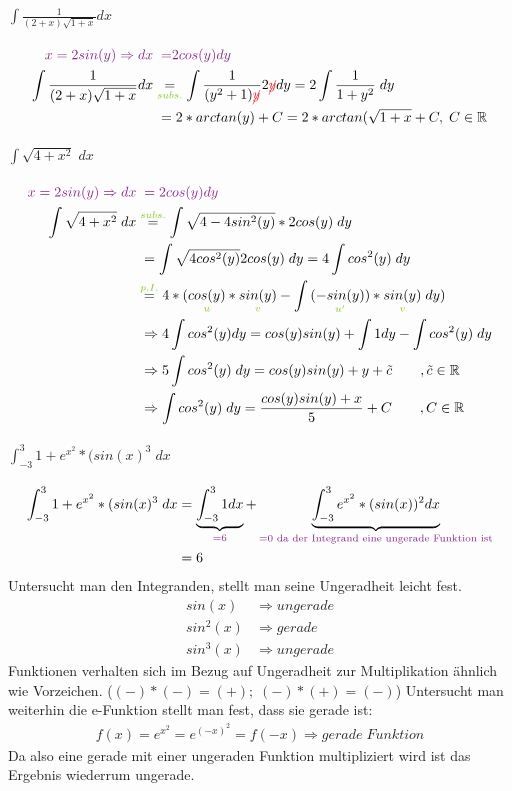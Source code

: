 \documentclass[12pt,a4paper]{article}%
\numberwithin{equation}{section}
\newcommand{\R}{\mathbb{R}} %
\newcommand{\subsubsubsection}{\paragraph}
\def\colBord#1{\begingroup\color{Fuchsia}{#1}\endgroup}
\def\colRed#1{\begingroup\color{Red}{#1}\endgroup}
\def\colGreen#1{\begingroup\color{LimeGreen}{#1}\endgroup}
\def\usGreen#1#2{\underset{\colGreen{#1}}{#2}}
\numberwithin{equation}{subsection}
\begin{document}
		\subsubsubsection{$\int \frac{1}{(2+x) \sqrt{1+x}}dx$}
		\begin{align}
			\colBord{x = 2sin(y) \Rightarrow dx} &\;\;\colBord{=} \colBord{2cos(y) dy} \nonumber\\
			\int \frac{1}{(2+x) \sqrt{1+x}}dx &\usGreen{subs.}{=} 
			\int \frac{1}{(y^2 + 1) \colRed{\cancel{y}}} 2\colRed{\cancel{y}} dy 
			= 2\int \frac{1}{1+y^2}\;dy \nonumber\\
			&\;= 2*arctan(y) + C = 2* arctan(\sqrt{1+x} + C ,\;C\in\R
		\end{align}
		
		\subsubsubsection{$\int \sqrt{4+x^2} \; dx$}
		\begin{align}
			\colBord{x = 2 sin(y) \Rightarrow dx} &\;\;\colBord{=} \colBord{\;2cos(y)dy} \nonumber\\
			\int \sqrt{4+x^2} \; dx &\overset{\colGreen{subs.}}{=}
			\int \sqrt{4-4sin^2(y)} * 2cos(y) \; dy \nonumber\\
			&\;= \int \sqrt{4cos^2(y)} 2cos(y) \; dy = 4\int cos^2(y) \; dy \nonumber\\
			&\overset{\colGreen{p.I.}}{=} 4*(\usGreen{u}{cos(y)} * \usGreen{v}{sin(y)} - \int \usGreen{u'}{(-sin(y))}*\usGreen{v}{sin(y)}\;dy) \nonumber\\
			&\;\Rightarrow 4\int cos^2(y) dy = cos(y)sin(y) + \int 1dy - \int cos^2(y)\; dy \nonumber\\
			&\;\Rightarrow 5\int cos^2(y)\;dy = cos(y)sin(y) + y + \tilde{c} \qquad ,\tilde{c}\in\R\nonumber\\
			&\;\Rightarrow \int cos^2(y)\;dy = \frac{cos(y)sin(y)+x}{5}+C \qquad, C\in\R
		\end{align}
		
		\subsubsubsection{$\int_{-3}^3 1+e^{x^2} *(sin(x)^3\;dx$}
		\begin{align}
			\int_{-3}^3 1+e^{x^2} *(sin(x)^3\;dx &= \underbrace{\int_{-3}^3 1 dx}_{\colBord{= 6}} 
			+ \underbrace{\int_{-3}^{3} e^{x^2} * (sin(x))^2 dx}_{\colBord{ = 0 \text{ da der Integrand 
			eine ungerade Funktion ist}}} \nonumber\\
			&= 6
		\end{align}
		Untersucht man den Integranden, stellt man seine Ungeradheit leicht fest.
		\begin{align*}
			sin(x) &\Rightarrow ungerade \\
			sin^2(x) &\Rightarrow gerade \\
			sin^3(x) &\Rightarrow ungerade
		\end{align*} 
		Funktionen verhalten sich im Bezug auf Ungeradheit zur Multiplikation ähnlich wie Vorzeichen.
		($(-)*(-) = (+);\; (-) * (+) = (-)$)
		Untersucht man weiterhin die e-Funktion stellt man fest, dass sie gerade ist:
		\begin{align*}
		  f(x) = e^{x^2} = e^{(-x)^2} = f(-x) \Rightarrow gerade \; Funktion
		\end{align*}
		Da also eine gerade mit einer ungeraden Funktion multipliziert wird ist das Ergebnis wiederrum ungerade.  
	  
\end{document}
